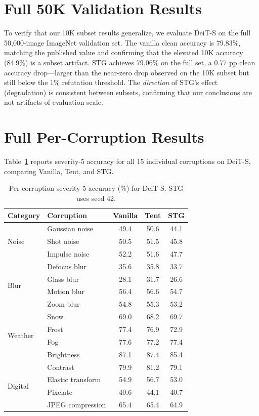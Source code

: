 \documentclass{article}
\newcommand{\methodname}{STG}
\begin{document}
\newpage
\appendix

\section{Full 50K Validation Results}
\label{app:full50k}

To verify that our 10K subset results generalize, we evaluate DeiT-S on the full 50,000-image ImageNet validation set. The vanilla clean accuracy is 79.83\%, matching the published value and confirming that the elevated 10K accuracy (84.9\%) is a subset artifact. \methodname{} achieves 79.06\% on the full set, a 0.77 pp clean accuracy drop---larger than the near-zero drop observed on the 10K subset but still below the 1\% refutation threshold. The \emph{direction} of STG's effect (degradation) is consistent between subsets, confirming that our conclusions are not artifacts of evaluation scale.

\section{Full Per-Corruption Results}
\label{app:percorruption}

Table~\ref{tab:fullcorruption} reports severity-5 accuracy for all 15 individual corruptions on DeiT-S, comparing Vanilla, Tent, and \methodname{}.

\begin{table}[h]
\centering
\caption{Per-corruption severity-5 accuracy (\%) for DeiT-S. \methodname{} uses seed 42.}
\label{tab:fullcorruption}
\begin{tabular}{llccc}
\toprule
Category & Corruption & Vanilla & Tent & \methodname{} \\
\midrule
\multirow{3}{*}{Noise}
 & Gaussian noise & 49.4 & 50.6 & 44.1 \\
 & Shot noise & 50.5 & 51.5 & 45.8 \\
 & Impulse noise & 52.2 & 51.6 & 47.7 \\
\midrule
\multirow{4}{*}{Blur}
 & Defocus blur & 35.6 & 35.8 & 33.7 \\
 & Glass blur & 28.1 & 31.7 & 26.6 \\
 & Motion blur & 56.4 & 56.6 & 54.7 \\
 & Zoom blur & 54.8 & 55.3 & 53.2 \\
\midrule
\multirow{4}{*}{Weather}
 & Snow & 69.0 & 68.2 & 69.7 \\
 & Frost & 77.4 & 76.9 & 72.9 \\
 & Fog & 77.6 & 77.2 & 77.4 \\
 & Brightness & 87.1 & 87.4 & 85.4 \\
\midrule
\multirow{4}{*}{Digital}
 & Contrast & 79.9 & 81.2 & 79.1 \\
 & Elastic transform & 54.9 & 56.7 & 53.0 \\
 & Pixelate & 40.6 & 44.1 & 40.7 \\
 & JPEG compression & 65.4 & 65.4 & 64.9 \\
\bottomrule
\end{tabular}
\end{table}
\end{document}
